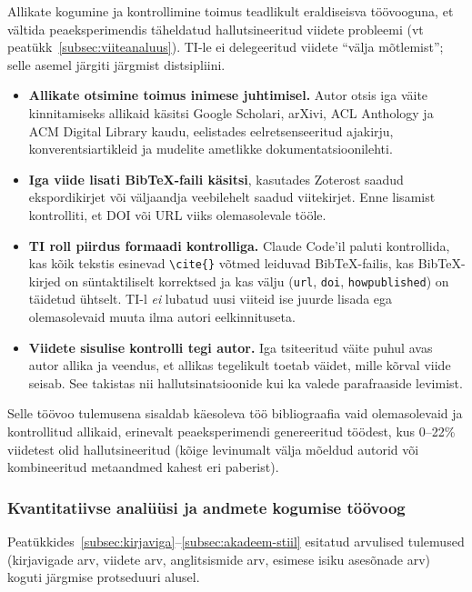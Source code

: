 Allikate kogumine ja kontrollimine toimus teadlikult eraldiseisva töövooguna, et vältida peaeksperimendis täheldatud hallutsineeritud viidete probleemi (vt peatükk~\ref{subsec:viiteanaluus}). TI-le ei delegeeritud viidete ``välja mõtlemist''; selle asemel järgiti järgmist distsipliini.

\begin{itemize}
    \item \textbf{Allikate otsimine toimus inimese juhtimisel.} Autor otsis iga väite kinnitamiseks allikaid käsitsi Google Scholari, arXivi, ACL Anthology ja ACM Digital Library kaudu, eelistades eelretsenseeritud ajakirju, konverentsiartikleid ja mudelite ametlikke dokumentatsioonilehti.
    \item \textbf{Iga viide lisati BibTeX-faili käsitsi}, kasutades Zoterost saadud ekspordikirjet või väljaandja veebilehelt saadud viitekirjet. Enne lisamist kontrolliti, et DOI või URL viiks olemasolevale tööle.
    \item \textbf{TI roll piirdus formaadi kontrolliga.} Claude Code'il paluti kontrollida, kas kõik tekstis esinevad \texttt{\textbackslash cite\{\}} võtmed leiduvad BibTeX-failis, kas BibTeX-kirjed on süntaktiliselt korrektsed ja kas välju (\texttt{url}, \texttt{doi}, \texttt{howpublished}) on täidetud ühtselt. TI-l \emph{ei} lubatud uusi viiteid ise juurde lisada ega olemasolevaid muuta ilma autori eelkinnituseta.
    \item \textbf{Viidete sisulise kontrolli tegi autor.} Iga tsiteeritud väite puhul avas autor allika ja veendus, et allikas tegelikult toetab väidet, mille kõrval viide seisab. See takistas nii hallutsinatsioonide kui ka valede parafraaside levimist.
\end{itemize}

Selle töövoo tulemusena sisaldab käesoleva töö bibliograafia vaid olemasolevaid ja kontrollitud allikaid, erinevalt peaeksperimendi genereeritud töödest, kus 0--22\% viidetest olid hallutsineeritud (kõige levinumalt välja mõeldud autorid või kombineeritud metaandmed kahest eri paberist).

\subsubsection{Kvantitatiivse analüüsi ja andmete kogumise töövoog}

Peatükkides~\ref{subsec:kirjaviga}--\ref{subsec:akadeem-stiil} esitatud arvulised tulemused (kirjavigade arv, viidete arv, anglitsismide arv, esimese isiku asesõnade arv) koguti järgmise protseduuri alusel.

